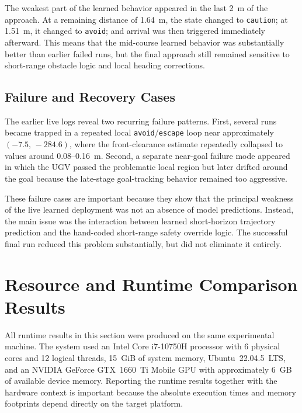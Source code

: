 The weakest part of the learned behavior appeared in the last 2~m of the approach. At a remaining distance of 1.64~m, the state changed to \texttt{caution}; at 1.51~m, it changed to \texttt{avoid}; and arrival was then triggered immediately afterward. This means that the mid-course learned behavior was substantially better than earlier failed runs, but the final approach still remained sensitive to short-range obstacle logic and local heading corrections.

\subsection{Failure and Recovery Cases}

The earlier live logs reveal two recurring failure patterns. First, several runs became trapped in a repeated local \texttt{avoid}/\texttt{escape} loop near approximately $(-7.5,\,-284.6)$, where the front-clearance estimate repeatedly collapsed to values around 0.08--0.16~m. Second, a separate near-goal failure mode appeared in which the UGV passed the problematic local region but later drifted around the goal because the late-stage goal-tracking behavior remained too aggressive.

These failure cases are important because they show that the principal weakness of the live learned deployment was not an absence of model predictions. Instead, the main issue was the interaction between learned short-horizon trajectory prediction and the hand-coded short-range safety override logic. The successful final run reduced this problem substantially, but did not eliminate it entirely.

\section{Resource and Runtime Comparison Results}

All runtime results in this section were produced on the same experimental machine. The system used an Intel Core i7-10750H processor with 6 physical cores and 12 logical threads, 15~GiB of system memory, Ubuntu~22.04.5~LTS, and an NVIDIA GeForce GTX~1660~Ti Mobile GPU with approximately 6~GB of available device memory. Reporting the runtime results together with the hardware context is important because the absolute execution times and memory footprints depend directly on the target platform.

